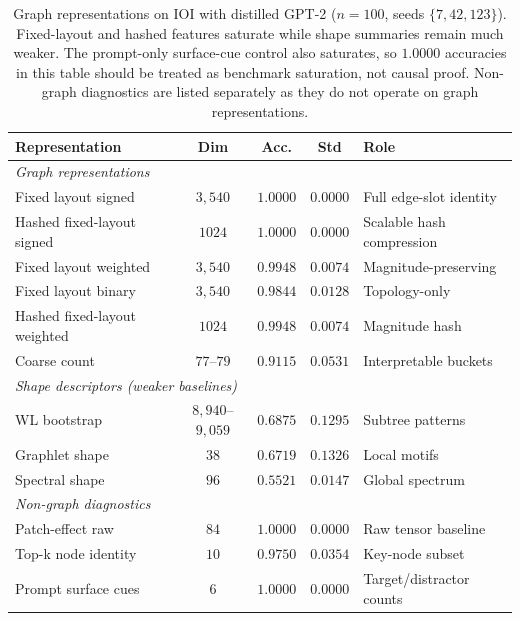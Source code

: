 \documentclass[11pt,a4paper]{article}
\begin{document}
\begin{table}[H]
\centering
\small
\begin{tabular}{lccc>{\raggedright\arraybackslash}p{}}
\toprule
\textbf{Representation} & \textbf{Dim} & \textbf{Acc.} & \textbf{Std} & \textbf{Role} \\
\midrule
\multicolumn{5}{l}{\textit{Graph representations}} \\
Fixed layout signed & $3,\!540$ & $1.0000$ & $0.0000$ & Full edge-slot identity \\
Hashed fixed-layout signed & $1024$ & $1.0000$ & $0.0000$ & Scalable hash compression \\
Fixed layout weighted & $3,\!540$ & $0.9948$ & $0.0074$ & Magnitude-preserving \\
Fixed layout binary & $3,\!540$ & $0.9844$ & $0.0128$ & Topology-only \\
Hashed fixed-layout weighted & $1024$ & $0.9948$ & $0.0074$ & Magnitude hash \\
Coarse count & $77$--$79$ & $0.9115$ & $0.0531$ & Interpretable buckets \\
\midrule
\multicolumn{5}{l}{\textit{Shape descriptors (weaker baselines)}} \\
WL bootstrap & $8,\!940$--$9,\!059$ & $0.6875$ & $0.1295$ & Subtree patterns \\
Graphlet shape & $38$ & $0.6719$ & $0.1326$ & Local motifs \\
Spectral shape & $96$ & $0.5521$ & $0.0147$ & Global spectrum \\
\midrule
\multicolumn{5}{l}{\textit{Non-graph diagnostics}} \\
Patch-effect raw & $84$ & $1.0000$ & $0.0000$ & Raw tensor baseline \\
Top-k node identity & $10$ & $0.9750$ & $0.0354$ & Key-node subset \\
Prompt surface cues & $6$ & $1.0000$ & $0.0000$ & Target/distractor counts \\
\bottomrule
\end{tabular}
\caption{Graph representations on IOI with distilled GPT-2 ($n=100$, seeds $\{7,42,123\}$). Fixed-layout and hashed features saturate while shape summaries remain much weaker. The prompt-only surface-cue control also saturates, so $1.0000$ accuracies in this table should be treated as benchmark saturation, not causal proof. Non-graph diagnostics are listed separately as they do not operate on graph representations.}
\label{tab:distilgpt2}
\end{table}
\end{document}
